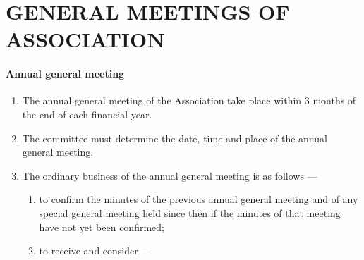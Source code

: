 \documentclass[../constitution.tex]{subfiles}
\begin{document}
\hypertarget{part-6-general-meetings-of-association}{%
\part{GENERAL MEETINGS OF ASSOCIATION}\label{part-6-general-meetings-of-association}}

\hypertarget{annual-general-meeting}{%
\subsection{Annual general meeting}\label{annual-general-meeting}}

\begin{enumerate}

\item The annual general meeting of the Association  take place within 3 months of the end of each financial year. 


\item The committee must determine the date, time and place of the annual general meeting.
\item The ordinary business of the annual general meeting is as follows ---

  \begin{enumerate}
  
  \item to confirm the minutes of the previous annual general meeting and of any special general meeting held since then if the minutes of that meeting have not yet been confirmed;
  \item to receive and consider ---

    \begin{enumerate}
    

\end{enumerate}
\end{enumerate}
\end{enumerate}
\end{document}
